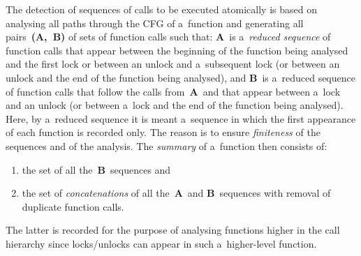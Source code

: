 The detection of sequences of calls to be executed atomically is based on
analysing all paths through the CFG of a~function and generating all 
pairs~\textbf{(A,~B)} of sets of function calls such that: \textbf{A}~is
a~\emph{reduced sequence} of function calls that appear between the 
beginning of the function being analysed and the first lock or between an
unlock and a~subsequent lock (or between an unlock and the end of the function
being analysed), and \textbf{B}~is a~reduced sequence of function calls that
follow the calls from~\textbf{A}~and that appear between a~lock and an unlock
(or between a~lock and the end of the function being analysed). Here, by
a~reduced sequence it is meant a~sequence in which the first appearance 
of each function is recorded only. The reason is to ensure \emph{finiteness} 
of the sequences and of the analysis. The \emph{summary} of a~function
then consists of:
\begin{enumerate}[label={(\roman*)}]
    \item
        the set of all the~\textbf{B}~sequences and
    
    \item
        the set of \emph{concatenations} of all 
        the~\textbf{A}~and \textbf{B}~sequences with removal of duplicate 
        function calls.
\end{enumerate}
The latter is recorded for the purpose of analysing functions higher in the 
call hierarchy since locks/unlocks can appear in such a~higher-level function.

